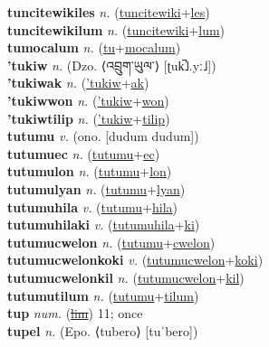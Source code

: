 \textbf{tuncitewikiles} \textit{n.} (\hyperref[tuncitewiki]{tuncitewiki}+\hyperref[les]{les})
 \label{tuncitewikiles} \\
\textbf{tuncitewikilum} \textit{n.} (\hyperref[tuncitewiki]{tuncitewiki}+\hyperref[lum]{lum})
 \label{tuncitewikilum} \\
\textbf{tumocalum} \textit{n.} (\hyperref[tu]{tu}+\hyperref[mocalum]{mocalum})
 \label{tumocalum} \\
\textbf{'tukiw} \textit{n.} (Dzo. ⟨འབྲུག་ཡུལ་⟩ [ʈuk̚˩.yː˩])
 \label{'tukiw} \\
\textbf{'tukiwak} \textit{n.} (\hyperref['tukiw]{'tukiw}+\hyperref[ak]{ak})
 \label{'tukiwak} \\
\textbf{'tukiwwon} \textit{n.} (\hyperref['tukiw]{'tukiw}+\hyperref[won]{won})
 \label{'tukiwwon} \\
\textbf{'tukiwtilip} \textit{n.} (\hyperref['tukiw]{'tukiw}+\hyperref[tilip]{tilip})
 \label{'tukiwtilip} \\
\textbf{tutumu} \textit{v.} (ono. [dudum dudum])
 \label{tutumu} \\
\textbf{tutumuec} \textit{n.} (\hyperref[tutumu]{tutumu}+\hyperref[ec]{ec})
 \label{tutumuec} \\
\textbf{tutumulon} \textit{n.} (\hyperref[tutumu]{tutumu}+\hyperref[lon]{lon})
 \label{tutumulon} \\
\textbf{tutumulyan} \textit{n.} (\hyperref[tutumu]{tutumu}+\hyperref[lyan]{lyan})
 \label{tutumulyan} \\
\textbf{tutumuhila} \textit{v.} (\hyperref[tutumu]{tutumu}+\hyperref[hila]{hila})
 \label{tutumuhila} \\
\textbf{tutumuhilaki} \textit{v.} (\hyperref[tutumuhila]{tutumuhila}+\hyperref[ki]{ki})
 \label{tutumuhilaki} \\
\textbf{tutumucwelon} \textit{n.} (\hyperref[tutumu]{tutumu}+\hyperref[cwelon]{cwelon})
 \label{tutumucwelon} \\
\textbf{tutumucwelonkoki} \textit{v.} (\hyperref[tutumucwelon]{tutumucwelon}+\hyperref[koki]{koki})
 \label{tutumucwelonkoki} \\
\textbf{tutumucwelonkil} \textit{n.} (\hyperref[tutumucwelon]{tutumucwelon}+\hyperref[kil]{kil})
 \label{tutumucwelonkil} \\
\textbf{tutumutilum} \textit{n.} (\hyperref[tutumu]{tutumu}+\hyperref[tilum]{tilum})
 \label{tutumutilum} \\
\textbf{tup} \textit{num.} (\hyperref[lim]{\sout{lim}})
11; once \label{tup} \\
\textbf{tupel} \textit{n.} (Epo. ⟨tubero⟩ [tuˈbero])
